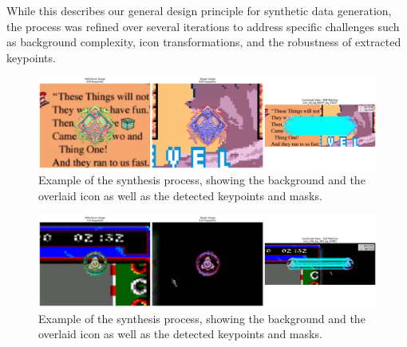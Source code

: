 While this describes our general design principle for synthetic data generation, the process was refined over several iterations to address specific challenges such as background complexity, icon transformations, and the robustness of extracted keypoints.

\begin{figure}[H]
    \centering
    \includegraphics[width=\textwidth]{ressources/example_data1.png}
    \caption{Example of the synthesis process, showing the background and the overlaid icon as well as the detected keypoints and masks.}
    \label{fig:synthesis_example1}
\end{figure}
\begin{figure}[H]
    \centering
    \includegraphics[width=\textwidth]{ressources/example_data2.png}
    \caption{Example of the synthesis process, showing the background and the overlaid icon as well as the detected keypoints and masks.}
    \label{fig:synthesis_example2}
\end{figure}

